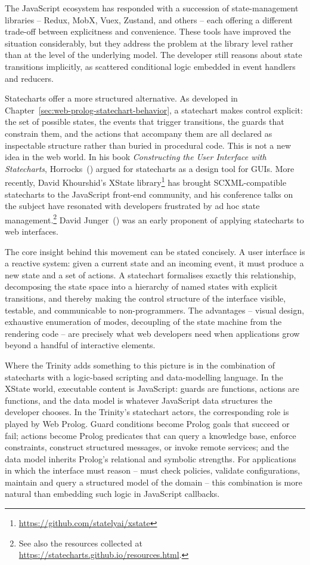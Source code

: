 The JavaScript ecosystem has responded with a succession of state-management libraries -- Redux, MobX, Vuex, Zustand, and others -- each offering a different trade-off between explicitness and convenience. These tools have improved the situation considerably, but they address the problem at the library level rather than at the level of the underlying model. The developer still reasons about state transitions implicitly, as scattered conditional logic embedded in event handlers and reducers.

Statecharts offer a more structured alternative. As developed in Chapter~\ref{sec:web-prolog-statechart-behavior}, a statechart makes control explicit: the set of possible states, the events that trigger transitions, the guards that constrain them, and the actions that accompany them are all declared as inspectable structure rather than buried in procedural code. This is not a new idea in the web world. In his book \emph{Constructing the User Interface with Statecharts}, Horrocks~(\citeyear{horrocks1999constructing}) argued for statecharts as a design tool for GUIs. More recently, David Khourshid's XState library\footnote{\url{https://github.com/statelyai/xstate}} has brought SCXML-compatible statecharts to the JavaScript front-end community, and his conference talks on the subject have resonated with developers frustrated by ad hoc state management.\footnote{See also the resources collected at \url{https://statecharts.github.io/resources.html}.} David Junger~(\citeyear{jungerclient}) was an early proponent of applying statecharts to web interfaces.

The core insight behind this movement can be stated concisely. A user interface is a reactive system: given a current state and an incoming event, it must produce a new state and a set of actions. A statechart formalises exactly this relationship, decomposing the state space into a hierarchy of named states with explicit transitions, and thereby making the control structure of the interface visible, testable, and communicable to non-programmers. The advantages -- visual design, exhaustive enumeration of modes, decoupling of the state machine from the rendering code -- are precisely what web developers need when applications grow beyond a handful of interactive elements.

Where the Trinity adds something to this picture is in the combination of statecharts with a logic-based scripting and data-modelling language. In the XState world, executable content is JavaScript: guards are functions, actions are functions, and the data model is whatever JavaScript data structures the developer chooses. In the Trinity's statechart actors, the corresponding role is played by Web Prolog. Guard conditions become Prolog goals that succeed or fail; actions become Prolog predicates that can query a knowledge base, enforce constraints, construct structured messages, or invoke remote services; and the data model inherits Prolog's relational and symbolic strengths. For applications in which the interface must reason -- must check policies, validate configurations, maintain and query a structured model of the domain -- this combination is more natural than embedding such logic in JavaScript callbacks.

